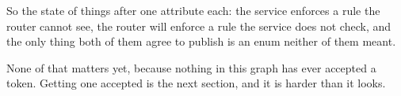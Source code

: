 So the state of things after one attribute each: the service enforces a rule
the router cannot see, the router will enforce a rule the service does not
check, and the only thing both of them agree to publish is an enum neither of
them meant.

\medskip

None of that matters yet, because nothing in this graph has ever accepted a
token. Getting one accepted is the next section, and it is harder than it
looks.

%
